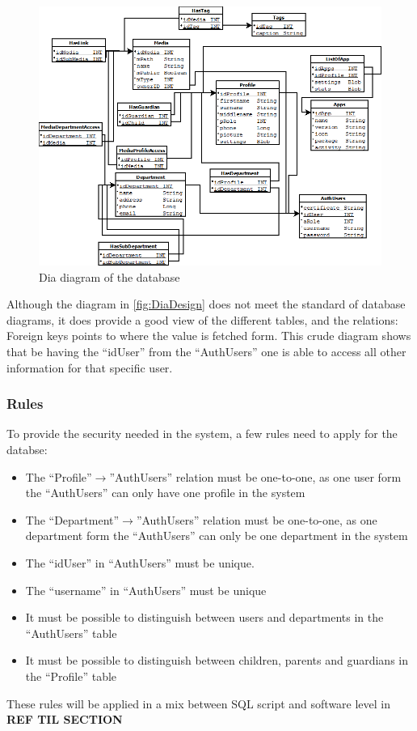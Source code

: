 \begin{figure}[htbp]
	\centering
		\includegraphics[width=1.00\textwidth]{images/DiaDesign.png}
	\caption{Dia diagram of the database}
	\label{fig:DiaDesign}
\end{figure}

Although the diagram in \autoref{fig:DiaDesign} does not meet the standard of database diagrams, it does provide a good view of the different tables, and the relations: Foreign keys points to where the value is fetched form. This crude diagram shows that be having the ``idUser'' from the ``AuthUsers'' one is able to access all other information for that specific user.

\subsubsection*{Rules}
\label{databaseRules}
To provide the security needed in the system, a few rules need to apply for the databse:
\begin{itemize}
	\item The ``Profile''$\rightarrow$''AuthUsers'' relation must be one-to-one, as one user form the ``AuthUsers'' can only have one profile in the system
	\item The ``Department''$\rightarrow$''AuthUsers'' relation must be one-to-one, as one department form the ``AuthUsers'' can only be one department in the system
	\item The ``idUser'' in ``AuthUsers'' must be unique.
	\item The ``username'' in ``AuthUsers'' must be unique
	\item It must be possible to distinguish between users and departments in the ``AuthUsers'' table
	\item It must be possible to distinguish between children, parents and guardians in the ``Profile'' table
\end{itemize}

These rules will be applied in a mix between SQL script and software level in \textbf{REF TIL SECTION}